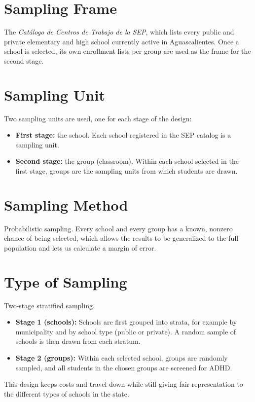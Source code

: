 \documentclass[11pt]{article}
\begin{document}
\section{Sampling Frame}
The \emph{Cat\'alogo de Centros de Trabajo de la SEP}, which lists every public and private elementary and high school currently active in Aguascalientes. Once a school is selected, its own enrollment lists per group are used as the frame for the second stage.

\section{Sampling Unit}
Two sampling units are used, one for each stage of the design:
\begin{itemize}[itemsep=2pt]
    \item \textbf{First stage:} the school. Each school registered in the SEP catalog is a sampling unit.
    \item \textbf{Second stage:} the group (classroom). Within each school selected in the first stage, groups are the sampling units from which students are drawn.
\end{itemize}

\section{Sampling Method}
Probabilistic sampling. Every school and every group has a known, nonzero chance of being selected, which allows the results to be generalized to the full population and lets us calculate a margin of error.

\section{Type of Sampling}
Two-stage stratified sampling.
\begin{itemize}[itemsep=2pt]
    \item \textbf{Stage 1 (schools):} Schools are first grouped into strata, for example by municipality and by school type (public or private). A random sample of schools is then drawn from each stratum.
    \item \textbf{Stage 2 (groups):} Within each selected school, groups are randomly sampled, and all students in the chosen groups are screened for ADHD.
\end{itemize}
This design keeps costs and travel down while still giving fair representation to the different types of schools in the state.
\end{document}
